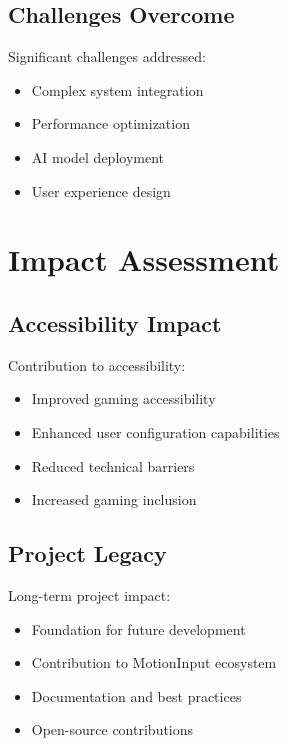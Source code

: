 \subsection{Challenges Overcome}
Significant challenges addressed:
\begin{itemize}
    \item Complex system integration
    \item Performance optimization
    \item AI model deployment
    \item User experience design
\end{itemize}

\section{Impact Assessment}
\subsection{Accessibility Impact}
Contribution to accessibility:
\begin{itemize}
    \item Improved gaming accessibility
    \item Enhanced user configuration capabilities
    \item Reduced technical barriers
    \item Increased gaming inclusion
\end{itemize}

\subsection{Project Legacy}
Long-term project impact:
\begin{itemize}
    \item Foundation for future development
    \item Contribution to MotionInput ecosystem
    \item Documentation and best practices
    \item Open-source contributions
\end{itemize}
